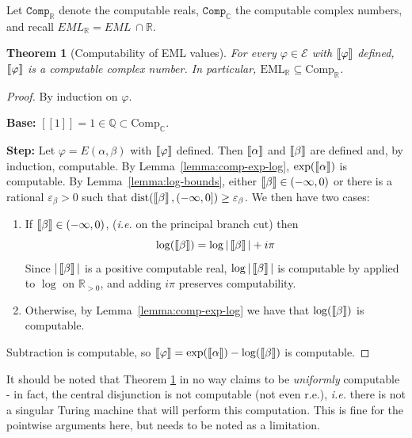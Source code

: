 \documentclass[a4paper,10pt]{article}
\newtheorem{theorem}{Theorem}
\newcommand{\rrbracket}{\right]\hspace{-0.15em}\right]}
\newcommand{\llbracket}{\left[\hspace{-0.15em}\left[}
\newcommand{\interpret}[1]{\llbracket #1 \rrbracket}
\begin{document}
Let $\mathtt{Comp}_\mathbb{R}$ denote the computable reals, $\mathtt{Comp}_\mathbb{C}$ the computable complex numbers, and recall $EML_\mathbb{R} = EML\ \cap \mathbb{R}$. 

\begin{theorem}[Computability of EML values]
\label{thm:comp-eml-values}
    For every $\varphi \in \mathcal{E}$ with $\interpret{\varphi}$ defined, $\interpret{\varphi}$ is a computable complex number. In particular, $\mathrm{EML}_\mathbb{R} \subseteq \mathrm{Comp}_\mathbb{R}$.
\end{theorem}
\begin{proof}
    By induction on $\varphi$.

    \textbf{Base:} $[\![1]\!] = 1 \in \mathbb{Q} \subset \mathrm{Comp}_\mathbb{C}$.

    \textbf{Step:} Let $\varphi = E(\alpha, \beta)$ with $\interpret{\varphi}$ defined. Then $\interpret{\alpha}$ and $\interpret{\beta}$ are defined and, by induction, computable. By Lemma~\ref{lemma:comp-exp-log}, $\exp(\interpret{\alpha})$ is computable. By Lemma~\ref{lemma:log-bounds}, either $\interpret{\beta} \in (-\infty, 0)$ or there is a rational $\varepsilon_\beta > 0$ such that $\mathrm{dist}(\interpret{\beta}, (-\infty, 0]) \geq \varepsilon_\beta$. We then have two cases:
    \begin{enumerate}
        \item If $\interpret{\beta} \in (-\infty, 0)$, (\emph{i.e.} on the principal branch cut) then $$\log(\interpret{\beta}) = \log|\interpret{\beta}| + i\pi$$ Since $|\interpret{\beta}|$ is a positive computable real, $\log|\interpret{\beta}|$ is computable by \cite[Thm.~6.5.2]{Weihrauch2000} applied to $\log$ on $\mathbb{R}_{>0}$, and adding $i\pi$ preserves computability.
        \item Otherwise, by Lemma~\ref{lemma:comp-exp-log} we have that $\log(\interpret{\beta})$ is computable.
    \end{enumerate}
    Subtraction is computable, so $\interpret{\varphi} = \exp(\interpret{\alpha}) - \log(\interpret{\beta})$ is computable.
\end{proof}

It should be noted that Theorem \ref{thm:comp-eml-values} in no way claims to be \emph{uniformly} computable - in fact, the central disjunction is not computable (not even r.e.), \emph{i.e.} there is not a singular Turing machine that will perform this computation. This is fine for the pointwise arguments here, but needs to be noted as a limitation.
\end{document}
